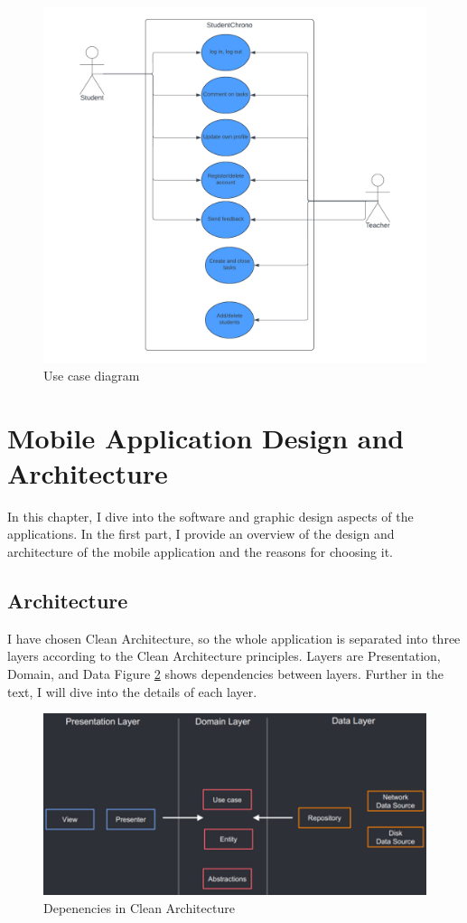 \documentclass[
  biblatex,
  language=english,
  figures=false,
  sourcecodes,
  glossaries,
  index
]{kidiplom}
\begin{document}
\begin{figure}[h]
\centering
\includegraphics[width=15cm]{image3}
\caption{Use case diagram}
\label{fig:image3}
\end{figure}

\section{Mobile Application Design and Architecture}
In this chapter, I dive into the software and graphic design aspects of the applications. In the first part, I provide an overview of the design and architecture of the mobile application and the reasons for choosing it.
\subsection{Architecture}
I have chosen Clean Architecture, so the whole application is separated into three layers according to the Clean Architecture principles. Layers are Presentation, Domain, and Data Figure \ref{fig:image4} shows dependencies between layers. Further in the text, I will dive into the details of each layer.

\begin{figure}[h]
\centering
\includegraphics[width=15cm]{image4}
\caption{Depenencies in Clean Architecture}
\label{fig:image4}
\end{figure}
\end{document}
